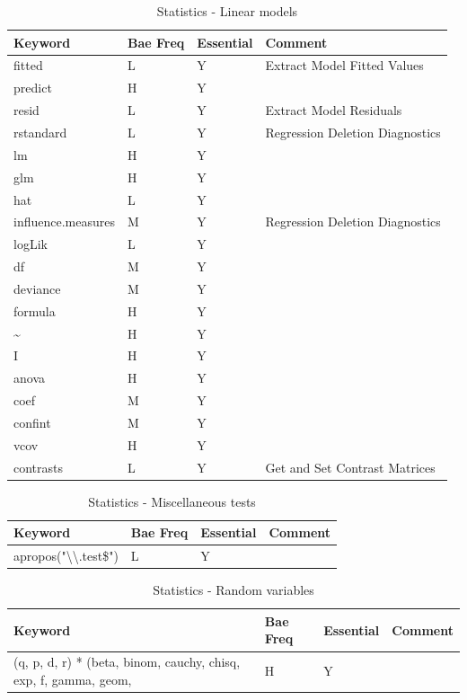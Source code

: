 \documentclass[11pt,]{krantz}
\theoremstyle{definition}
\theoremstyle{definition}
\theoremstyle{remark}
\begin{document}
\begin{table}

\caption{\label{tab:knitchunk17}Statistics - Linear models }
\centering
\begin{tabular}[t]{llll}
\toprule
Keyword & Bae Freq & Essential & Comment\\
\midrule
fitted & L & Y & Extract Model Fitted Values\\
predict & H & Y & \\
resid & L & Y & Extract Model Residuals\\
rstandard & L & Y & Regression Deletion Diagnostics\\
lm & H & Y & \\
\addlinespace
glm & H & Y & \\
hat & L & Y & \\
influence.measures & M & Y & Regression Deletion Diagnostics\\
logLik & L & Y & \\
df & M & Y & \\
\addlinespace
deviance & M & Y & \\
formula & H & Y & \\
\textasciitilde{} & H & Y & \\
I & H & Y & \\
anova & H & Y & \\
\addlinespace
coef & M & Y & \\
confint & M & Y & \\
vcov & H & Y & \\
contrasts & L & Y & Get and Set Contrast Matrices\\
\bottomrule
\end{tabular}
\end{table}

\begin{table}

\caption{\label{tab:knitchunk18}Statistics - Miscellaneous tests}
\centering
\begin{tabular}[t]{llll}
\toprule
Keyword & Bae Freq & Essential & Comment\\
\midrule
apropos("\textbackslash{}\textbackslash{}.test\$") & L & Y & \\
\bottomrule
\end{tabular}
\end{table}

\begin{table}

\caption{\label{tab:knitchunk19}Statistics - Random variables }
\centering
\begin{tabular}[t]{llll}
\toprule
Keyword & Bae Freq & Essential & Comment\\
\midrule
(q, p, d, r) * (beta, binom, cauchy, chisq, exp, f, gamma, geom, & H & Y & \\
\bottomrule
\end{tabular}
\end{table}
\end{document}
